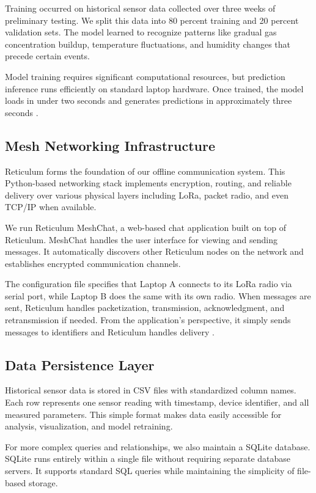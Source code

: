 Training occurred on historical sensor data collected over three weeks of preliminary testing. We split this data into 80 percent training and 20 percent validation sets. The model learned to recognize patterns like gradual gas concentration buildup, temperature fluctuations, and humidity changes that precede certain events.

Model training requires significant computational resources, but prediction inference runs efficiently on standard laptop hardware. Once trained, the model loads in under two seconds and generates predictions in approximately three seconds \cite{paszke2019pytorch}.

\subsection{Mesh Networking Infrastructure}

Reticulum forms the foundation of our offline communication system. This Python-based networking stack implements encryption, routing, and reliable delivery over various physical layers including LoRa, packet radio, and even TCP/IP when available.

We run Reticulum MeshChat, a web-based chat application built on top of Reticulum. MeshChat handles the user interface for viewing and sending messages. It automatically discovers other Reticulum nodes on the network and establishes encrypted communication channels.

The configuration file specifies that Laptop A connects to its LoRa radio via serial port, while Laptop B does the same with its own radio. When messages are sent, Reticulum handles packetization, transmission, acknowledgment, and retransmission if needed. From the application's perspective, it simply sends messages to identifiers and Reticulum handles delivery \cite{reticulum2023documentation}.

\subsection{Data Persistence Layer}

Historical sensor data is stored in CSV files with standardized column names. Each row represents one sensor reading with timestamp, device identifier, and all measured parameters. This simple format makes data easily accessible for analysis, visualization, and model retraining.

For more complex queries and relationships, we also maintain a SQLite database. SQLite runs entirely within a single file without requiring separate database servers. It supports standard SQL queries while maintaining the simplicity of file-based storage.


